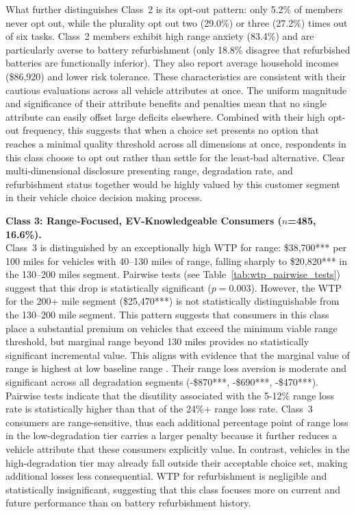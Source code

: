 \documentclass[a4paper,fleqn]{cas-sc}   %
\begin{document}
What further distinguishes Class~2 is its opt-out pattern: only 5.2\% of members never opt out, while the plurality opt out two (29.0\%) or three (27.2\%) times out of six tasks. Class~2 members exhibit high range anxiety (83.4\%) and are particularly averse to battery refurbishment (only 18.8\% disagree that refurbished batteries are functionally inferior). They also report average household incomes (\$86,920) and lower risk tolerance. These characteristics are consistent with their cautious evaluations across all vehicle attributes at once. The uniform magnitude and significance of their attribute benefits and penalties mean that no single attribute can easily offset large deficits elsewhere. Combined with their high opt-out frequency, this suggests that when a choice set presents no option that reaches a minimal quality threshold across all dimensions at once, respondents in this class choose to opt out rather than settle for the least-bad alternative. Clear multi-dimensional disclosure presenting range, degradation rate, and refurbishment status together would be highly valued by this customer segment in their vehicle choice decision making process.

\medskip

\noindent\textbf{Class 3: Range-Focused, EV-Knowledgeable Consumers ($n$=485, 16.6\%).}\\
Class~3 is distinguished by an exceptionally high WTP for range: \$38,700*** per 100 miles for vehicles with 40--130 miles of range, falling sharply to \$20,820*** in the 130--200 miles segment. Pairwise tests (see Table~\ref{tab:wtp_pairwise_tests}) suggest that this drop is statistically significant ($p = 0.003$). However, the WTP for the 200+ mile segment (\$25,470***) is not statistically distinguishable from the 130--200 mile segment. This pattern suggests that consumers in this class place a substantial premium on vehicles that exceed the minimum viable range threshold, but marginal range beyond 130 miles provides no statistically significant incremental value. This aligns with evidence that the marginal value of range is highest at low baseline range \parencite{dimitropoulosConsumerValuationChanges2013, hackbarthWillingnesstopayAlternativeFuel2016}. Their range loss aversion is moderate and significant across all degradation segments (-\$870***, -\$690***, -\$470***). Pairwise tests indicate that the disutility associated with the 5-12\% range loss rate is statistically higher than that of the 24\%+ range loss rate. Class~3 consumers are range-sensitive, thus each additional percentage point of range loss in the low-degradation tier carries a larger penalty because it further reduces a vehicle attribute that these consumers explicitly value. In contrast, vehicles in the high-degradation tier may already fall outside their acceptable choice set, making additional losses less consequential. WTP for refurbishment is negligible and statistically insignificant, suggesting that this class focuses more on current and future performance than on battery refurbishment history.
\end{document}
